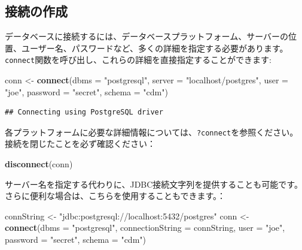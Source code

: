 \documentclass[
  11pt]{book}
\newenvironment{Shaded}{\begin{snugshade}}{\end{snugshade}}
\newcommand{\AttributeTok}[1]{\textcolor[rgb]{0.13,0.29,0.53}{#1}}
\newcommand{\FunctionTok}[1]{\textcolor[rgb]{0.13,0.29,0.53}{\textbf{#1}}}
\newcommand{\NormalTok}[1]{#1}
\newcommand{\OtherTok}[1]{\textcolor[rgb]{0.56,0.35,0.01}{#1}}
\newcommand{\StringTok}[1]{\textcolor[rgb]{0.31,0.60,0.02}{#1}}
\theoremstyle{definition}
\theoremstyle{definition}
\theoremstyle{definition}
\theoremstyle{definition}
\theoremstyle{remark}
\begin{document}
\subsection{接続の作成}\label{ux63a5ux7d9aux306eux4f5cux6210}

データベースに接続するには、データベースプラットフォーム、サーバーの位置、ユーザー名、パスワードなど、多くの詳細を指定する必要があります。\texttt{connect}関数を呼び出し、これらの詳細を直接指定することができます: 

\begin{Shaded}
\begin{Highlighting}[]
\NormalTok{conn }\OtherTok{\textless{}{-}} \FunctionTok{connect}\NormalTok{(}\AttributeTok{dbms =} \StringTok{"postgresql"}\NormalTok{,}
                \AttributeTok{server =} \StringTok{"localhost/postgres"}\NormalTok{,}
                \AttributeTok{user =} \StringTok{"joe"}\NormalTok{,}
                \AttributeTok{password =} \StringTok{"secret"}\NormalTok{,}
                \AttributeTok{schema =} \StringTok{"cdm"}\NormalTok{)}
\end{Highlighting}
\end{Shaded}

\begin{verbatim}
## Connecting using PostgreSQL driver
\end{verbatim}

各プラットフォームに必要な詳細情報については、\texttt{?connect}を参照ください。接続を閉じたことを必ず確認ください：

\begin{Shaded}
\begin{Highlighting}[]
\FunctionTok{disconnect}\NormalTok{(conn)}
\end{Highlighting}
\end{Shaded}

サーバー名を指定する代わりに、JDBC接続文字列を提供することも可能です。さらに便利な場合は、こちらを使用することもできます。：

\begin{Shaded}
\begin{Highlighting}[]
\NormalTok{connString }\OtherTok{\textless{}{-}} \StringTok{"jdbc:postgresql://localhost:5432/postgres"}
\NormalTok{conn }\OtherTok{\textless{}{-}} \FunctionTok{connect}\NormalTok{(}\AttributeTok{dbms =} \StringTok{"postgresql"}\NormalTok{,}
                \AttributeTok{connectionString =}\NormalTok{ connString,}
                \AttributeTok{user =} \StringTok{"joe"}\NormalTok{,}
                \AttributeTok{password =} \StringTok{"secret"}\NormalTok{,}
                \AttributeTok{schema =} \StringTok{"cdm"}\NormalTok{)}
\end{Highlighting}
\end{Shaded}
\end{document}
